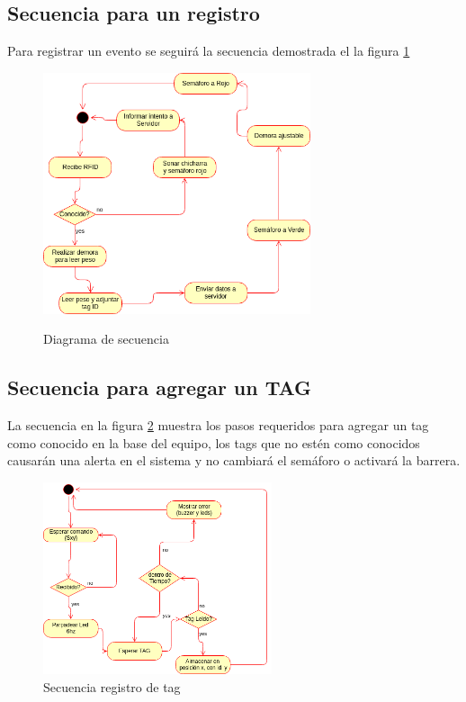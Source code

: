 \subsection{Secuencia para un registro}
Para registrar un evento se seguir\'a la secuencia demostrada el la figura \ref{fig:sequence-elect}
\begin{figure}[h!]
	\begin{center}
		\includegraphics[width=0.7\textwidth]{images/diagrama_secuencia_electronica.png}
		\label{fig:sequence-elect}
		\caption{Diagrama de secuencia}
	\end{center}
\end{figure}

\subsection{Secuencia para agregar un TAG}
La secuencia en la figura \ref{fig:seq-tag} muestra los pasos requeridos para agregar un tag como conocido en la base del equipo, 
los tags que no estén como conocidos causarán una alerta en el sistema y no cambiará el semáforo o activará la barrera.
\begin{figure}[h!]
	\begin{center}
		\includegraphics[width=0.6\textwidth]{images/secuencia-agregar-tag.png}
		\caption{Secuencia registro de tag}
		\label{fig:seq-tag}
	\end{center}
\end{figure}

